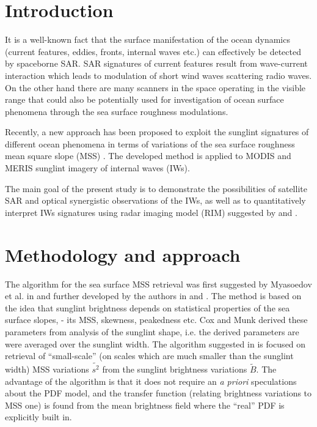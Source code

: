 \documentclass[draft,grl]{agutex}
\begin{document}
\begin{article}

%
%


\section{Introduction}

It is a well-known fact that the surface manifestation of the ocean dynamics (current features, eddies, fronts, internal waves etc.) can effectively be detected by spaceborne SAR. SAR signatures of current features result from wave-current interaction which leads to modulation of short wind waves scattering radio waves. On the other hand there are many scanners in the space operating in the visible range that could also be potentially used for investigation of ocean surface phenomena through the sea surface roughness modulations.

Recently, a new approach has been proposed to exploit the sunglint signatures of different ocean phenomena in terms of variations of the sea surface roughness mean square slope (MSS) \citep{Kudryavtsev2012a}. The developed method is applied to MODIS and MERIS sunglint imagery of internal waves (IWs). 

The main goal of the present study is to demonstrate the possibilities of satellite SAR and optical synergistic observations of the IWs, as well as to quantitatively interpret IWs signatures using radar imaging model (RIM) suggested by \cite{Kudryavtsev2005} and \cite{Johannessen2005}.


\section{Methodology and approach}

The algorithm for the sea surface MSS retrieval was first suggested by Myasoedov et al. in \citep{Myasoedov2010a} and further developed by the authors in \citep{Kudryavtsev2012a} and \citep{Kudryavtsev2012b}. The method is based on the idea that sunglint brightness depends on statistical properties of the sea surface slopes, - its MSS, skewness, peakedness etc. Cox and Munk \citep{Cox1954} derived these parameters from analysis of the sunglint shape, i.e. the derived parameters are were averaged over the sunglint width. The algorithm suggested in \citep{Kudryavtsev2012a} is focused on retrieval of ``small-scale'' (on scales which are much smaller than the sunglint width) MSS variations $\tilde{s^2}$ from the sunglint brightness variations $\tilde{B}$. The advantage of the algorithm is that it does not require an \textit{a priori} speculations about the PDF model, and the transfer function (relating brightness variations to MSS one) is found from the mean brightness field where the ``real'' PDF is explicitly built in.



\end{article}
\end{document}
